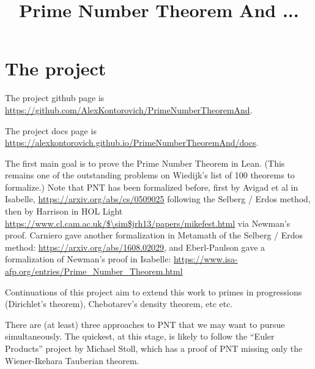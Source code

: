 \usepackage{amsmath, amsthm}
\usepackage{hyperref}

\theoremstyle{definition}
\newtheorem{definition}{Definition}
\newtheorem{theorem}{Theorem}
\newtheorem{proposition}{Proposition}
\newtheorem{lemma}{Lemma}
\newtheorem{corollary}{Corollary}

\title{Prime Number Theorem And ...}

\newcommand{\eps}{\epsilon}

\newcommand{\R}{\mathbb{R}}
\newcommand{\Q}{\mathbb{Q}}
\newcommand{\C}{\mathbb{C}}
\newcommand{\Z}{\mathbb{Z}}
\newcommand{\N}{\mathbb{N}}



\maketitle

\chapter{The project}

The project github page is \url{https://github.com/AlexKontorovich/PrimeNumberTheoremAnd}.

The project docs page is \url{https://alexkontorovich.github.io/PrimeNumberTheoremAnd/docs}.

The first main goal is to prove the Prime Number Theorem in Lean.
(This remains one of the outstanding problems on Wiedijk's list of 100 theorems to formalize.)
Note that PNT has been formalized before, first by Avigad et al in Isabelle,
\url{https://arxiv.org/abs/cs/0509025}
following the Selberg / Erdos method, then
by Harrison in HOL Light
\url{https://www.cl.cam.ac.uk/$\sim$jrh13/papers/mikefest.html}
via Newman's proof.
Carniero gave another formalization in Metamath of the Selberg / Erdos method:
\url{https://arxiv.org/abs/1608.02029},
and Eberl-Paulson gave a formalization of Newman's proof in Isabelle:
\url{https://www.isa-afp.org/entries/Prime\_Number\_Theorem.html}

Continuations of this project aim to extend
this work to primes in progressions (Dirichlet's theorem), Chebotarev's density theorem, etc
etc.

There are (at least) three approaches to PNT that we may want to pursue simultaneously. The quickest, at this stage, is likely to
follow
 the ``Euler Products'' project by Michael Stoll, which has a proof of PNT missing only the Wiener-Ikehara Tauberian theorem.

